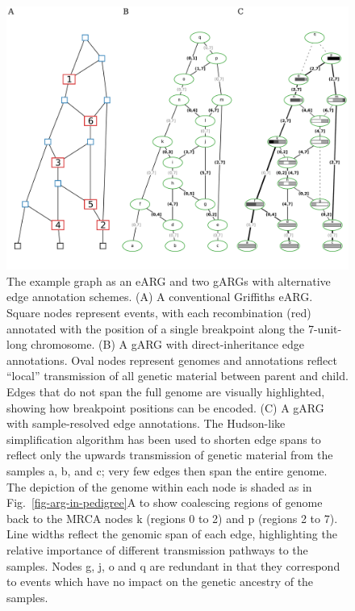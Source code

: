 \documentclass{article}
\begin{document}
\begin{figure}
\centering
\includegraphics[width=\textwidth]{illustrations/ancestry-resolution}
\caption{\label{fig-ancestry-resolution}
The \citet[][Fig.~1]{wiuf1999recombination} example graph as an eARG and
two gARGs with alternative edge annotation schemes.
(A) A conventional Griffiths eARG. Square nodes represent events, with
each recombination (red) annotated with the position of a single breakpoint
along the 7-unit-long chromosome.
(B) A gARG with direct-inheritance edge annotations. Oval nodes represent
genomes and annotations reflect ``local'' transmission of all genetic material
between parent and child. Edges that do not span the full genome are visually
highlighted, showing how breakpoint positions can be encoded.
(C) A gARG with sample-resolved edge annotations. The Hudson-like simplification
algorithm has been used to shorten edge spans to
reflect only the upwards transmission of genetic material from the samples
\textsf{a}, \textsf{b}, and \textsf{c}; very few edges then span the entire genome.
The depiction of the genome within each
node is shaded as in Fig.~\ref{fig-arg-in-pedigree}A to show coalescing
regions of genome back to the MRCA nodes \textsf{k} (regions 0 to 2) and \textsf{p}
(regions 2 to 7). Line widths reflect the genomic span of each edge, highlighting
the relative importance of different transmission pathways to the samples. Nodes
\textsf{g},  \textsf{j}, \textsf{o} and \textsf{q} are redundant in that they correspond
to events which have no impact on the genetic ancestry of the samples.
}
\end{figure}
\end{document}
